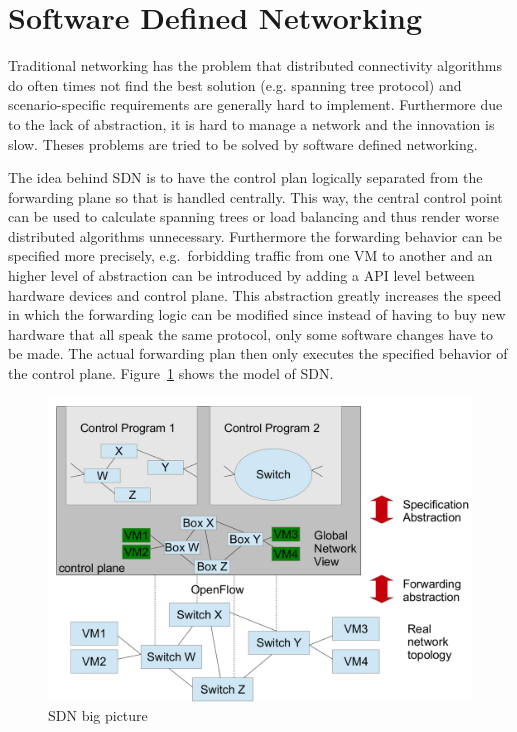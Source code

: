 
\section{Software Defined Networking}
Traditional networking has the problem that distributed connectivity algorithms do often times not find the best solution (e.g. spanning tree protocol) and scenario-specific requirements are generally hard to implement.
Furthermore due to the lack of abstraction, it is hard to manage a network and the innovation is slow.
Theses problems are tried to be solved by software defined networking.\\
\vspace{5pt}

The idea behind SDN is to have the control plan logically separated from the forwarding plane so that is handled centrally.
This way, the central control point can be used to calculate spanning trees or load balancing and thus render worse distributed algorithms unnecessary.
Furthermore the forwarding behavior can be specified more precisely, e.g.\ forbidding traffic from one VM to another and an higher level of abstraction can be introduced by adding a API level between hardware devices and control plane.
This abstraction greatly increases the speed in which the forwarding logic can be modified since instead of having to buy new hardware that all speak the same protocol, only some software changes have to be made.
The actual forwarding plan then only executes the specified behavior of the control plane.
Figure~\ref{fig:sdn_big_picture} shows the model of SDN.
\begin{figure}[h]
  \centering
  \includegraphics[width=.6\textwidth]{figures/sdn_big_picture.png}
  \caption{SDN big picture}\label{fig:sdn_big_picture}
\end{figure}

